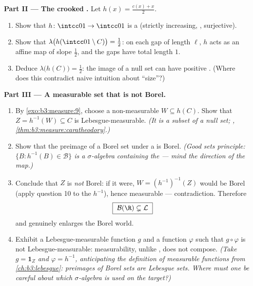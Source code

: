 \begin{problem}
\medskip
\noindent\textbf{Part II --- The crooked .} Let
$h(x) = \frac{c(x) + x}{2}$.
\begin{enumerate}[resume]
  \item Show that $h \colon \intcc01 \to \intcc01$ is a
         (strictly increasing, ,
        surjective).
  \item Show that $\lambda\bigl(h(\intcc01\setminus C)\bigr) =
        \tfrac12$: on each gap of length $\ell$, $h$ acts as an
        affine map of slope $\tfrac12$, and the gaps have total
        length $1$.
  \item Deduce $\lambda\bigl(h(C)\bigr) = \tfrac12$: the
         image of a null set can have positive
        . (Where does this contradict naive intuition
        about ``size''?)
\end{enumerate}

\medskip
\noindent\textbf{Part III --- A measurable set that is not
Borel.}
\begin{enumerate}[resume]
  \item By \cref{exo:b3:measure:9}, choose a non-measurable $W
        \subseteq h(C)$. Show that $Z = h^{-1}(W) \subseteq C$
        is Lebesgue-measurable. \emph{(It is a subset of a null
        set; , \cref{thm:b3:measure:caratheodory}.)}
  \item Show that the preimage of a Borel set under a
         is Borel. \emph{(Good sets principle:
        $\{B : h^{-1}(B) \in \mathcal B\}$ is a
        $\sigma$-algebra containing the  --- mind the
        direction of the map.)}
  \item Conclude that $Z$ is \emph{not} Borel: if it were,
        $W = (h^{-1})^{-1}(Z)$ would be Borel (apply question
        10 to the  $h^{-1}$), hence measurable ---
        contradiction. Therefore
        \[
        \boxed{\ \mathcal B(\R) \subsetneq \mathcal L\ }
        \]
        and  genuinely enlarges the Borel world.
  \item Exhibit a Lebesgue-measurable function $g$ and a
         function $\varphi$ such that $g \circ
        \varphi$ is not Lebesgue-measurable: measurability,
        unlike , does not compose. \emph{(Take $g =
        \mathbf 1_Z$ and $\varphi = h^{-1}$, anticipating the
        definition of measurable functions from
        \cref{ch:b3:lebesgue}: preimages of Borel sets are
        Lebesgue sets. Where must one be careful about which
        $\sigma$-algebra is used on the target?)}
\end{enumerate}


\end{problem}
